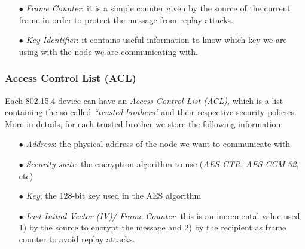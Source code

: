 \documentclass[12pt]{report}
\begin{document}
{\begin{itemize}
\begin{itemize}
\setlength{\itemindent}{+4mm}
\item \emph{AES-CTR}: data payload is encrypted using AES 128-bit counter mode.
\item \emph{AES-CBC-MAC}: data payload is not encrypted, but a Message Authentication Code (MAC) is computed and attached to the end of the   data payload.\\
The MAC is created encrypting information from the 802.15.4 header and the data payload.
Its length can be 32 bits, 64 bits, or 128 bits, depending on the specified security level, but in any case it is calculated using a 128 bit key.
\item \emph{AES-CCM}: it is the combination of the two previous ones.\\
More details about this algorithm will be discussed in section \ref{ssec:zigbeesecfeatures}.
\end{itemize}

\item[$\bullet$] \emph{Frame Counter}: it is a simple counter given by the source of the current frame in order to protect the message from replay attacks. 

\item[$\bullet$] \emph{Key Identifier}: it contains useful information to know which key we are using with the node we are communicating with.\\
\end{itemize}

\subsubsection{Access Control List (ACL)}
\bigskip

Each 802.15.4 device can have an \emph{Access Control List (ACL)}, which is a list containing the so-called \emph{``trusted-brothers"} and their respective security policies.\\
More in details, for each trusted brother we store the following information:

\begin{itemize}
\setlength{\itemindent}{+4mm}
\item[$\bullet$] \emph{Address}: the physical address of the node we want to communicate with
\item[$\bullet$] \emph{Security suite}: the encryption algorithm to use (\emph{AES-CTR}, \emph{AES-CCM-32}, etc)
\item[$\bullet$] \emph{Key}: the 128-bit key used in the AES algorithm
\item[$\bullet$] \emph{Last Initial Vector (IV)/ Frame Counter}: this is an incremental value used 1) by the source to encrypt the message and 2) by the recipient as frame counter to avoid replay attacks.\\
\end{itemize}

}
\end{document}
